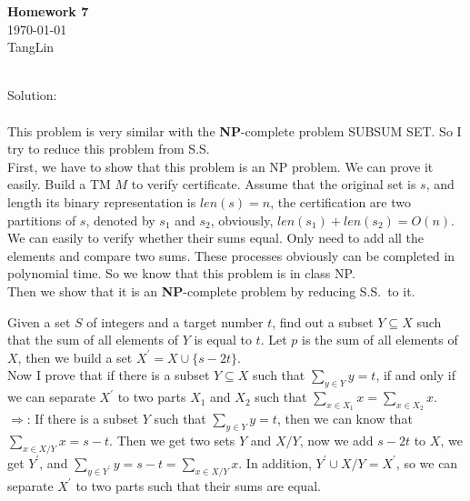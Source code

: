 \documentclass[a4papper]{article}
\theoremstyle{neosn}
\begin{document}
    \begin{center}
    {\bf Homework 7} \\
        \today \\
        TangLin
    \end{center}

     \\

    Solution: \\
    \\
    This problem is very similar with the \textbf{NP}-complete problem SUBSUM SET.
    So I try to reduce this problem from S.S\@. \\
    First, we have to show that this problem is an NP problem.
    We can prove it easily.
    Build a TM $M$ to verify certificate.
    Assume that the original set is $s$, and length its binary representation is $len(s) = n$,
    the certification are two partitions of $s$, denoted by $s_1$ and $s_2$, obviously,
    $len(s_1) + len(s_2) = O(n)$.
    We can easily to verify whether their sums equal.
    Only need to add all the elements and compare two sums.
    These processes obviously can be completed in polynomial time.
    So we know that this problem is in class NP. \\

    Then we show that it is an \textbf{NP}-complete problem by reducing S.S.\ to it.

    Given a set $S$ of integers and a target number $t$, find out a subset $Y \subseteq X$ such
    that the sum of all elements of $Y$ is equal to $t$.
    Let $p$ is the sum of all elements of $X$, then we build a set $X^{\prime} = X \cup \{s - 2t\}$.\\
    Now I prove that if there is a subset $Y \subseteq X$ such that $\sum_{y \in Y}{y} = t $, if and only
    if we can separate $X^{\prime}$ to two parts $X_1$ and $X_2$ such that $\sum_{x \in X_1}{x} = \sum_{x \in X_2}{x}$.\\

    $\Rightarrow$: If there is a subset $Y$ such that $\sum_{y \in Y} y = t$, then we can know that
    $\sum_{x \in X \slash Y}x = s-t$.
    Then we get two sets $Y$ and $X \slash Y$, now we add $s-2t$ to $X$, we get $Y^{\prime}$, and
    $\sum_{y \in Y^{\prime}} y = s-t = \sum_{x \in X \slash Y} x$.
    In addition, $Y^{\prime} \cup X \slash Y = X^{\prime}$, so we can separate $X^{\prime}$ to two
    parts such that their sums are equal. \\
\end{document}
